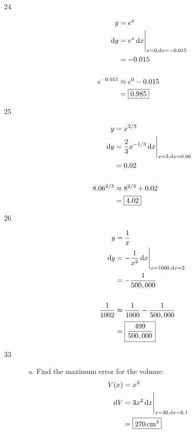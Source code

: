 \documentclass[letterpaper]{exam}
\newcommand{\dx}{\dif x}
\newcommand{\dy}{\dif y}
\begin{document}
\begin{description}
    \item[24]
      \begin{align*}
        y          & = e^x \\
        \dy        & =  \eval{ e^x \dx }_{x = 0, \dx = -0.015 } \\
                   & = -0.015 \\
        \\
        e^{-0.015} & \approx e^0 - 0.015 \\
                   & = \boxed{ 0.985 } \\
      \end{align*}

    \item[25]
      \begin{align*}
        y          & = x^{2/3} \\
        \dy        & =  \eval{ \frac{2}{3} x^{-1/3} \dx }_{x = 2, \dx = 0.06 } \\
                   & = 0.02 \\
        \\
        8.06^{2/3} & \approx 8^{2/3} + 0.02 \\
                   & = \boxed{ 4.02 } \\
      \end{align*}

    \item[26]
      \begin{align*}
        y              & = \frac{1}{x} \\
        \dy            & =  \eval{ - \frac{1}{x^2} \dx }_{x = 1000, \dx = 2 } \\
                       & = - \frac{1}{500,000} \\
        \\
        \frac{1}{1002} & \approx \frac{1}{1000} - \frac{1}{500,000} \\
                       & = \boxed{ \frac{499}{500,000} }
     \end{align*}

    \newpage

    \item[33]
      \begin{enumerate}[(a)]
        \item 
          Find the maximum error for the volume:
          \begin{align*}
            V(x)   & = x^3 \\
            \dif V & = \eval{ 3x^2 \dx }_{x = 30, \dx = 0.1} \\
                   & = \boxed{ \unit[270]{cm^3} } \\
          \end{align*}


\end{enumerate}
\end{description}
\end{document}

